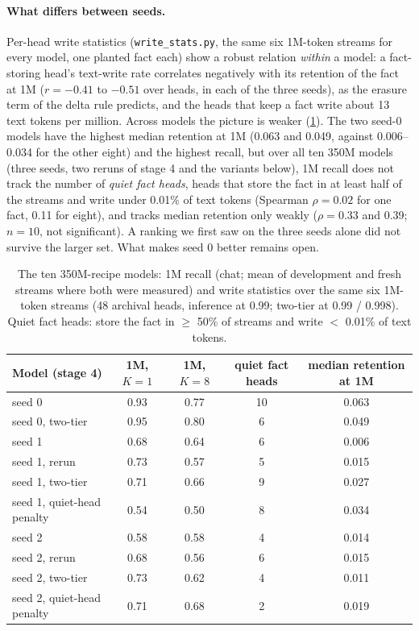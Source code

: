 \documentclass[11pt]{article}
\begin{document}
\paragraph{What differs between seeds.} Per-head write statistics (\texttt{write\_stats.py}, the same six 1M-token streams for every model, one planted fact each) show a robust relation \emph{within} a model: a fact-storing head's text-write rate correlates negatively with its retention of the fact at 1M ($r = -0.41$ to $-0.51$ over heads, in each of the three seeds), as the erasure term of the delta rule predicts, and the heads that keep a fact write about 13 text tokens per million. Across models the picture is weaker (\cref{tab:quiet}). The two seed-0 models have the highest median retention at 1M (0.063 and 0.049, against 0.006--0.034 for the other eight) and the highest recall, but over all ten 350M models (three seeds, two reruns of stage 4 and the variants below), 1M recall does not track the number of \emph{quiet fact heads}, heads that store the fact in at least half of the streams and write under 0.01\% of text tokens (Spearman $\rho = 0.02$ for one fact, 0.11 for eight), and tracks median retention only weakly ($\rho = 0.33$ and 0.39; $n = 10$, not significant). A ranking we first saw on the three seeds alone did not survive the larger set. What makes seed 0 better remains open.

\begin{table}[t]
\centering
\small
\caption{The ten 350M-recipe models: 1M recall (chat; mean of development and fresh streams where both were measured) and write statistics over the same six 1M-token streams (48 archival heads, inference at 0.99; two-tier at 0.99 / 0.998). Quiet fact heads: store the fact in $\ge$ 50\% of streams and write $<$ 0.01\% of text tokens.}
\label{tab:quiet}
\begin{tabular}{@{}lcccc@{}}
\toprule
Model (stage 4) & 1M, $K = 1$ & 1M, $K = 8$ & quiet fact heads & median retention at 1M \\
\midrule
seed 0 & 0.93 & 0.77 & 10 & 0.063 \\
seed 0, two-tier & 0.95 & 0.80 & 6 & 0.049 \\
seed 1 & 0.68 & 0.64 & 6 & 0.006 \\
seed 1, rerun & 0.73 & 0.57 & 5 & 0.015 \\
seed 1, two-tier & 0.71 & 0.66 & 9 & 0.027 \\
seed 1, quiet-head penalty & 0.54 & 0.50 & 8 & 0.034 \\
seed 2 & 0.58 & 0.58 & 4 & 0.014 \\
seed 2, rerun & 0.68 & 0.56 & 6 & 0.015 \\
seed 2, two-tier & 0.73 & 0.62 & 4 & 0.011 \\
seed 2, quiet-head penalty & 0.71 & 0.68 & 2 & 0.019 \\
\bottomrule
\end{tabular}
\end{table}
\end{document}
